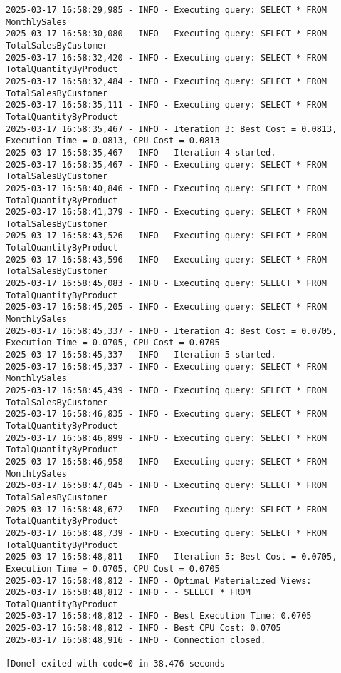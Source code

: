 \begin{lstlisting}[style=pythonstyle, caption={Output from python code }, label={lst:pso_query_optimization}]
2025-03-17 16:58:29,985 - INFO - Executing query: SELECT * FROM MonthlySales
2025-03-17 16:58:30,080 - INFO - Executing query: SELECT * FROM TotalSalesByCustomer
2025-03-17 16:58:32,420 - INFO - Executing query: SELECT * FROM TotalQuantityByProduct
2025-03-17 16:58:32,484 - INFO - Executing query: SELECT * FROM TotalSalesByCustomer
2025-03-17 16:58:35,111 - INFO - Executing query: SELECT * FROM TotalQuantityByProduct
2025-03-17 16:58:35,467 - INFO - Iteration 3: Best Cost = 0.0813, Execution Time = 0.0813, CPU Cost = 0.0813
2025-03-17 16:58:35,467 - INFO - Iteration 4 started.
2025-03-17 16:58:35,467 - INFO - Executing query: SELECT * FROM TotalSalesByCustomer
2025-03-17 16:58:40,846 - INFO - Executing query: SELECT * FROM TotalQuantityByProduct
2025-03-17 16:58:41,379 - INFO - Executing query: SELECT * FROM TotalSalesByCustomer
2025-03-17 16:58:43,526 - INFO - Executing query: SELECT * FROM TotalQuantityByProduct
2025-03-17 16:58:43,596 - INFO - Executing query: SELECT * FROM TotalSalesByCustomer
2025-03-17 16:58:45,083 - INFO - Executing query: SELECT * FROM TotalQuantityByProduct
2025-03-17 16:58:45,205 - INFO - Executing query: SELECT * FROM MonthlySales
2025-03-17 16:58:45,337 - INFO - Iteration 4: Best Cost = 0.0705, Execution Time = 0.0705, CPU Cost = 0.0705
2025-03-17 16:58:45,337 - INFO - Iteration 5 started.
2025-03-17 16:58:45,337 - INFO - Executing query: SELECT * FROM MonthlySales
2025-03-17 16:58:45,439 - INFO - Executing query: SELECT * FROM TotalSalesByCustomer
2025-03-17 16:58:46,835 - INFO - Executing query: SELECT * FROM TotalQuantityByProduct
2025-03-17 16:58:46,899 - INFO - Executing query: SELECT * FROM TotalQuantityByProduct
2025-03-17 16:58:46,958 - INFO - Executing query: SELECT * FROM MonthlySales
2025-03-17 16:58:47,045 - INFO - Executing query: SELECT * FROM TotalSalesByCustomer
2025-03-17 16:58:48,672 - INFO - Executing query: SELECT * FROM TotalQuantityByProduct
2025-03-17 16:58:48,739 - INFO - Executing query: SELECT * FROM TotalQuantityByProduct
2025-03-17 16:58:48,811 - INFO - Iteration 5: Best Cost = 0.0705, Execution Time = 0.0705, CPU Cost = 0.0705
2025-03-17 16:58:48,812 - INFO - Optimal Materialized Views:
2025-03-17 16:58:48,812 - INFO - - SELECT * FROM TotalQuantityByProduct
2025-03-17 16:58:48,812 - INFO - Best Execution Time: 0.0705
2025-03-17 16:58:48,812 - INFO - Best CPU Cost: 0.0705
2025-03-17 16:58:48,916 - INFO - Connection closed.

[Done] exited with code=0 in 38.476 seconds


\end{lstlisting}